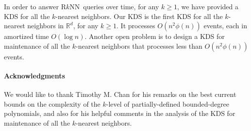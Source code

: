 \documentclass[preprint,12pt]{elsarticle}
\def\rknn{\mbox{R$k$NN}}
\begin{document}
In order to answer \rknn~queries over time, for any $k\geq 1$, we have provided a KDS for all the $k$-nearest neighbors. Our KDS is the first KDS for all the $k$-nearest neighbors in $\mathbb{R}^d$, for any $k\geq 1$. It processes $O(n^2\phi(n))$ events, each in amortized time $O(\log n)$. Another open problem is to design a KDS for maintenance of all the $k$-nearest neighbors that processes less than $O(n^2\phi(n))$ events.




\paragraph{\textbf{Acknowledgments}} We would like to thank Timothy M. Chan for his remarks on the best current bounds on the complexity of the $k$-level of partially-defined bounded-degree polynomials, and also for his helpful comments in the analysis of the KDS for maintenance of all the $k$-nearest neighbors.


\end{document}
